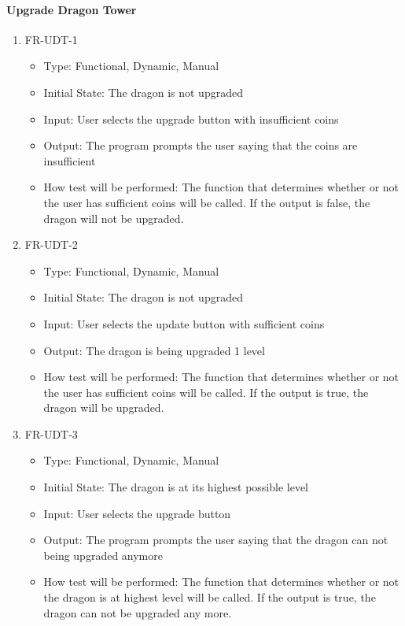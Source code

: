 \documentclass[12,english]{article}
\begin{document}
\paragraph{Upgrade Dragon Tower}
\begin{enumerate}
  \item FR-UDT-1
  \begin{itemize}
      \item Type: Functional, Dynamic, Manual
      \item Initial State: The dragon is not upgraded
      \item Input: User selects the upgrade button with insufficient coins
      \item Output: The program prompts the user saying that the coins are insufficient
      \item How test will be performed: The function that determines whether or not the user has sufficient coins will be called. If the output is false, the dragon will not be upgraded. 
  \end{itemize}
  \item FR-UDT-2
  \begin{itemize}
      \item Type: Functional, Dynamic, Manual
      \item Initial State: The dragon is not upgraded
      \item Input: User selects the update button with sufficient coins
      \item Output: The dragon is being upgraded 1 level 
      \item How test will be performed: The function that determines whether or not the user has sufficient coins will be called. If the output is true, the dragon will be upgraded. 
  \end{itemize}
  \item FR-UDT-3
  \begin{itemize}
      \item Type: Functional, Dynamic, Manual
      \item Initial State: The dragon is at its highest possible level
      \item Input: User selects the upgrade button
      \item Output: The program prompts the user saying that the dragon can not being upgraded anymore
      \item How test will be performed: The function that determines whether or not the dragon is at highest level will be called. If the output is true, the dragon can not be upgraded any more. 
  \end{itemize}
\end{enumerate}
\end{document}
